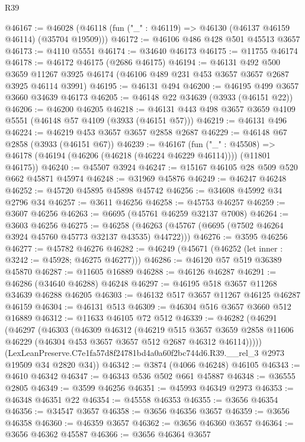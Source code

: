 \begin{lexlean}{R39}
\begin{coremodule}
@46167 := @46028 (@46118 (fun ("_" : @46119) => @46130 (@46137 @46159 @46114) (@35704 @19509)))
@46172 := @46106 @486 @428 @501 @45513 @3657
@46173 := @4110 @5551
@46174 := @34640 @46173
@46175 := @11755 @46174
@46178 := @46172 @46175 (@2686 @46175)
@46194 := @46131
    @492
    @500
    @3659
    @11267
    @3925
    @46174
    (@46106 @489 @231 @453 @3657 @3657 @2687 @3925 @46114 @3991)
@46195 := @46131 @494
@46200 := @46195 @499 @3657 @3660 @34639 @46173
@46205 := @46148 @22 @34639 (@3933 (@46151 @22))
@46206 := @46200 @46205
@46218 := @46131 @443 @498 @3657 @3659 @4109 @5551 (@46148 @57 @4109 (@3933 (@46151 @57)))
@46219 := @46131 @496
@46224 := @46219 @453 @3657 @3657 @2858 @2687
@46229 := @46148 @67 @2858 (@3933 (@46151 @67))
@46239 := @46167
    (fun ("_" : @45508) => @46178 (@46194 (@46206 (@46218 (@46224 @46229 @46114)))) (@11801 @46175))
@46240 := @45507 @3924
@46247 := @15167 @46105 @28 @509 @520 @662 @45871 @45974
@46248 := @31969 @45876
@46249 := @46247 @46248
@46252 := @45720 @45895 @45898 @45742
@46256 := @34608 @45992 @34 @2796 @34
@46257 := @3611 @46256
@46258 := @45753 @46257
@46259 := @3607 @46256
@46263 := @6695 (@45761 @46259 @32137 @7008)
@46264 := @3603 @46256
@46275 := @46258 (@46263 (@45767 (@6695 (@7502 @46264 @3924 @45760 @45773 @32137 @43535) @44722)))
@46276 := @3595 @46256
@46277 := @45782 @46276
@46282 := @46249 (@45671 (@46252 (let inner : @3242 := @45928; @46275 @46277)))
@46286 := @46120 @57 @519 @36389 @45870
@46287 := @11605 @16889
@46288 := @46126 @46287
@46291 := @46286 (@34640 @46288) @46248
@46297 := @46195 @518 @3657 @11268 @34639 @46288 @46205
@46303 := @46132 @517 @3657 @11267 @46125 @46287 @46159
@46304 := @46131 @513
@46309 := @46304 @516 @3657 @3660 @512 @16889
@46312 := @11633 @46105 @72 @512
@46339 := @46282
    (@46291
      (@46297
        (@46303
          (@46309
            @46312
            (@46219
              @515
              @3657
              @3659
              @2858
              @11606
              @46229
              (@46304 @453 @3657 @3657 @512 @2687 @46312 @46114)))))
      (LexLeanPreserve.C7e1fa57d8f24781bd4a0a60f2bc744d6.R39.__rel_3 @2973 @19509 @34 @2820 @34))
@46342 := @3874 (@4066 @46248) @46105
@46343 := @4610 @46342
@46347 := @46343 @536 @502 @661 @45887
@46348 := @36555 @2805
@46349 := @3599 @46256
@46351 := @45993 @46349 @2973
@46353 := @46348 @46351 @22
@46354 := @45558 @46353
@46355 := @3656 @46354
@46356 := @34547 @3657
@46358 := @3656 @46356 @3657
@46359 := @3656 @46358
@46360 := @46359 @3657
@46362 := @3656 @46360 @3657
@46364 := @3656 @46362 @45587
@46366 := @3656 @46364 @3657

\end{coremodule}
\end{lexlean}
